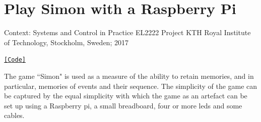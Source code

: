 \chapter{Play Simon with a Raspberry Pi}

\noindent Context: Systems and Control in Practice EL2222 Project
\noindent KTH Royal Institute of Technology, Stockholm, Sweden; 2017

\noindent \href{https://github.com/li9i/EL2222_Project}{\texttt{[Code]}}

The game ``Simon" is used as a measure of the ability to retain memories, and in
particular, memories of events and their sequence. The simplicity of the game
can be captured by the equal simplicity with which the game as an artefact can
be set up using a Raspberry pi, a small breadboard, four or more leds
and some cables.
